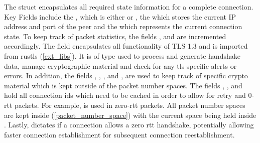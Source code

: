 The  struct encapsulates all required state information for a complete connection. Key Fields include the ,
which is either  or , the  which stores the current IP address and port of the peer and the 
 which represents the current connection state. To keep track of packet statistics, the fields ,  and 
 are incremented accordingly. The  field encapsulates all functionality of TLS 1.3 and is
imported from rustls (\ref{ext_libs}). It is of type  used to process and generate handshake data,
manage cryptographic material and check for any tls specific alerts or errors. In addition, the fields ,
, ,
 and , are used to keep track of specific crypto material which is kept outside of the packet
number spaces. The fields , , 
and  hold all connection
ids which need to be cached in order to allow for retry and 0-rtt packets. For example,  is used
in zero-rtt packets. All packet number spaces are kept inside
(\ref{packet_number_space}) with the current space being held inside .
Lastly, 
dictates if a connection allows a zero rtt handshake, potentially allowing faster connection establishment
for subsequent connection reestablishment.

